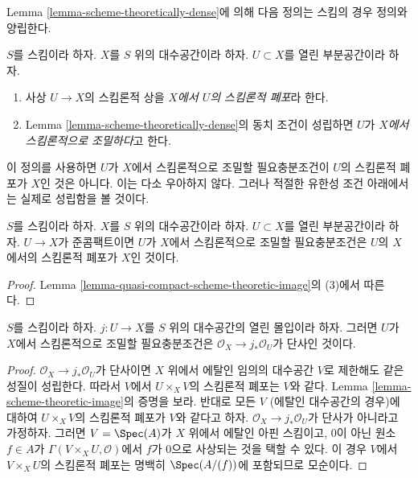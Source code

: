 \noindent
Lemma \ref{lemma-scheme-theoretically-dense}에 의해 다음 정의는
스킴의 경우 정의와 양립한다.

\begin{definition}
\label{definition-scheme-theoretically-dense}
$S$를 스킴이라 하자.
$X$를 $S$ 위의 대수공간이라 하자.
$U \subset X$를 열린 부분공간이라 하자.
\begin{enumerate}
\item 사상 $U \to X$의 스킴론적 상을
{\it $X$에서 $U$의 스킴론적 폐포}라 한다.
\item Lemma \ref{lemma-scheme-theoretically-dense}의 동치 조건이
성립하면 $U$가 {\it $X$에서 스킴론적으로 조밀하다}고 한다.
\end{enumerate}
\end{definition}

\noindent
이 정의를 사용하면 $U$가 $X$에서 스킴론적으로 조밀할 필요충분조건이
$U$의 스킴론적 폐포가 $X$인 것은 아니다. 이는 다소 우아하지 않다.
그러나 적절한 유한성 조건 아래에서는 실제로 성립함을 볼 것이다.

\begin{lemma}
\label{lemma-scheme-theoretically-dense-quasi-compact}
$S$를 스킴이라 하자. $X$를 $S$ 위의 대수공간이라 하자.
$U \subset X$를 열린 부분공간이라 하자.
$U \to X$가 준콤팩트이면 $U$가 $X$에서 스킴론적으로 조밀할
필요충분조건은 $U$의 $X$에서의 스킴론적 폐포가 $X$인 것이다.
\end{lemma}

\begin{proof}
Lemma \ref{lemma-quasi-compact-scheme-theoretic-image}의
(3)에서 따른다.
\end{proof}

\begin{lemma}
\label{lemma-characterize-scheme-theoretically-dense}
$S$를 스킴이라 하자. $j : U \to X$를 $S$ 위의 대수공간의
열린 몰입이라 하자. 그러면 $U$가 $X$에서 스킴론적으로 조밀할
필요충분조건은 $\mathcal{O}_X \to j_*\mathcal{O}_U$가
단사인 것이다.
\end{lemma}

\begin{proof}
$\mathcal{O}_X \to j_*\mathcal{O}_U$가 단사이면
$X$ 위에서 에탈인 임의의 대수공간 $V$로 제한해도 같은 성질이
성립한다. 따라서 $V$에서 $U \times_X V$의 스킴론적 폐포는 $V$와
같다. Lemma \ref{lemma-scheme-theoretic-image}의 증명을 보라.
반대로 모든 $V$ (에탈인 대수공간의 경우)에 대하여
$U \times_X V$의
스킴론적 폐포가 $V$와 같다고 하자.
$\mathcal{O}_X \to j_*\mathcal{O}_U$가 단사가 아니라고 가정하자.
그러면 $V = \Spec(A)$가 $X$ 위에서 에탈인 아핀 스킴이고,
0이 아닌 원소 $f \in A$가
$\Gamma(V \times_X U, \mathcal{O})$에서 $f$가 0으로 사상되는 것을
택할 수 있다. 이 경우 $V$에서 $V \times_X U$의 스킴론적 폐포는
명백히 $\Spec(A/(f))$에 포함되므로 모순이다.
\end{proof}

